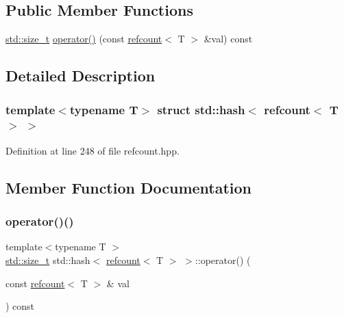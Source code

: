 \subsection*{Public Member Functions}
\begin{DoxyCompactItemize}
\item 
\hyperlink{tutorial__pact__2019_2Introduction_2sixth_2test_8c_a7c94ea6f8948649f8d181ae55911eeaf}{std\+::size\+\_\+t} \hyperlink{structstd_1_1hash_3_01refcount_3_01T_01_4_01_4_a9c7265bc31a55e60310de3d145fd5611}{operator()} (const \hyperlink{structrefcount}{refcount}$<$ T $>$ \&val) const
\end{DoxyCompactItemize}


\subsection{Detailed Description}
\subsubsection*{template$<$typename T$>$\newline
struct std\+::hash$<$ refcount$<$ T $>$ $>$}



Definition at line 248 of file refcount.\+hpp.



\subsection{Member Function Documentation}
\mbox{\label{structstd_1_1hash_3_01refcount_3_01T_01_4_01_4_a9c7265bc31a55e60310de3d145fd5611}} 
\subsubsection{\texorpdfstring{operator()()}{operator()()}}
{\footnotesize\ttfamily template$<$typename T $>$ \\
\hyperlink{tutorial__pact__2019_2Introduction_2sixth_2test_8c_a7c94ea6f8948649f8d181ae55911eeaf}{std\+::size\+\_\+t} std\+::hash$<$ \hyperlink{structrefcount}{refcount}$<$ T $>$ $>$\+::operator() (\begin{DoxyParamCaption}\item[{const \hyperlink{structrefcount}{refcount}$<$ T $>$ \&}]{val }\end{DoxyParamCaption}) const\hspace{0.3cm}{\ttfamily [inline]}}



